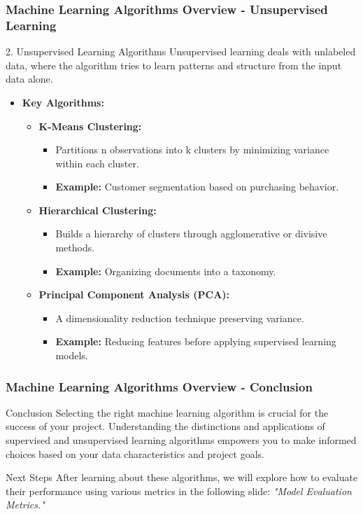 \documentclass[aspectratio=169]{beamer}
\begin{document}
\begin{frame}[fragile]
    \frametitle{Machine Learning Algorithms Overview - Unsupervised Learning}
    \begin{block}{2. Unsupervised Learning Algorithms}
        Unsupervised learning deals with unlabeled data, where the algorithm tries to learn patterns and structure from the input data alone.
    \end{block}
    \begin{itemize}
        \item \textbf{Key Algorithms:}
        \begin{itemize}
            \item \textbf{K-Means Clustering:}
            \begin{itemize}
                \item Partitions n observations into k clusters by minimizing variance within each cluster.
                \item \textbf{Example:} Customer segmentation based on purchasing behavior.
            \end{itemize}
            \item \textbf{Hierarchical Clustering:}
            \begin{itemize}
                \item Builds a hierarchy of clusters through agglomerative or divisive methods.
                \item \textbf{Example:} Organizing documents into a taxonomy.
            \end{itemize}
            \item \textbf{Principal Component Analysis (PCA):}
            \begin{itemize}
                \item A dimensionality reduction technique preserving variance.
                \item \textbf{Example:} Reducing features before applying supervised learning models.
            \end{itemize}
        \end{itemize}
    \end{itemize}
\end{frame}

\begin{frame}[fragile]
    \frametitle{Machine Learning Algorithms Overview - Conclusion}
    \begin{block}{Conclusion}
        Selecting the right machine learning algorithm is crucial for the success of your project. 
        Understanding the distinctions and applications of supervised and unsupervised learning algorithms empowers you to make informed choices based on your data characteristics and project goals.
    \end{block}
    \begin{block}{Next Steps}
        After learning about these algorithms, we will explore how to evaluate their performance using various metrics in the following slide: 
        \textit{"Model Evaluation Metrics."}
    \end{block}
\end{frame}
\end{document}
